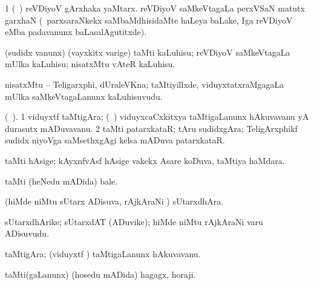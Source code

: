 {{{{{{\bentry
{} 
\gl{\nA}
\bmng
\bnum
\num{1}  
 (\kanmu\ \birx) 
\hypertarget{wireless(2)2a}{} 
\banum
{} reVDiyoV gArxhaka yaMtarx. 
 reVDiyoV saMkeVtagaLa perxVSaN matutx garxhaN (\kanmu\ parxsaraNkekx saMbaMdhisidaMte haLeya baLake, Iga reVDiyoV eMba padavanunx baLasalAgutitxde). 
\eanum
\numie
\enum
\emng
\eentry

\bentry
{} 
\gl{\akirx}
\bmng
(sudidx \mo vanunx) (vayxkitx \mo varige) taMti kaLuhisu; reVDiyoV saMkeVtagaLa mUlka kaLuhisu; nisatxMtu vAteR kaLuhisu. 
\emng
\eentry

\bentry
{}
 \gl{\nA}\bmng
{} 
\emng
\eentry

\bentry
{}
\gl{\nA}
\bmng
nisatxMtu -- Teligarxphi, dUraleVKna; taMtiyillxde, viduyxtatxraMgagaLa mUlka saMkeVtagaLanunx kaLuhisuvudu. 
\emng
\eentry

\bentry
{}
  \gl{\nA} (\bava\ ).\bmng
\bnum
\num{1} viduyxtf taMtigAra; (\kanmu\ \ame) viduyxcaCxkitxya taMtigaLanunx hAkuvavanu yA durasutx mADuvavanu. 
\num{2} taMti patarxkataR; tAru sudidxgAra; TeligArxphikf sudidx niyoVga saMsethxgAgi kelsa mADuva patarxkataR. 
\enum
\emng
\eentry

\bentry
{}
 \gl{\nA}\bmng
taMti hAsige; kAyxnfvAsf hAsige \mo vakekx Asare koDuva, taMtiya haMdara. 
\emng
\eentry

\bentry
{}
\gl{\nA}
\bmng
taMti (heNedu mADida) bale. 
\emng
\eentry

\bentry
{}
  \gl{\nA}\bmng
(hiMde niMtu sUtarx ADisuva, rAjkAraNi \mo) sUtarxdhAra. 
\emng
\eentry

\bentry
{}
  \gl{\nA}\bmng
sUtarxdhArike; sUtarxdAT (ADuvike); hiMde niMtu rAjkAraNi \mo varu ADisuvudu. 
\emng
\eentry

\bentry
{}
  \gl{\nA}\bmng
taMtigAra; (viduyxtf \mo) taMtigaLanunx hAkuvavanu. 
\emng
\eentry

\bentry
{}
 \gl{\nA}\bmng
taMti(gaLanunx) (hosedu mADida) hagagx, horaji. 
\emng
\eentry

}}}}}}
